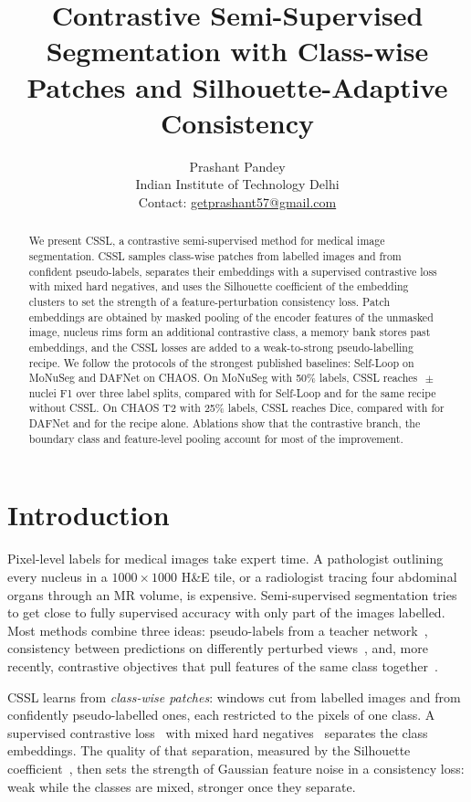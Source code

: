 \documentclass[11pt]{article}
\title{Contrastive Semi-Supervised Segmentation with Class-wise Patches and Silhouette-Adaptive Consistency}
\author{Prashant Pandey\\
Indian Institute of Technology Delhi\\
Contact: \href{mailto:getprashant57@gmail.com}{getprashant57@gmail.com}}
\date{}
\let\origpm\pm
\renewcommand{\pm}{\ensuremath{\,{\scriptstyle\origpm}\,}}
\begin{document}
\maketitle

\begin{abstract}
We present CSSL, a contrastive semi-supervised method for medical image segmentation. CSSL samples class-wise patches from labelled images and from confident pseudo-labels, separates their embeddings with a supervised contrastive loss with mixed hard negatives, and uses the Silhouette coefficient of the embedding clusters to set the strength of a feature-perturbation consistency loss. Patch embeddings are obtained by masked pooling of the encoder features of the unmasked image, nucleus rims form an additional contrastive class, a memory bank stores past embeddings, and the CSSL losses are added to a weak-to-strong pseudo-labelling recipe. We follow the protocols of the strongest published baselines: Self-Loop on MoNuSeg and DAFNet on CHAOS. On MoNuSeg with 50\% labels, CSSL reaches \nMcsslMean\pm\nMcsslSd{} nuclei F1 over three label splits, compared with \nSL{} for Self-Loop and \nMrecMean{} for the same recipe without CSSL. On CHAOS T2 with 25\% labels, CSSL reaches \nCcsslBMean{} Dice, compared with \nDAF{} for DAFNet and \nCrecBMean{} for the recipe alone. Ablations show that the contrastive branch, the boundary class and feature-level pooling account for most of the improvement.
\end{abstract}

\section{Introduction}
\label{sec:intro}

Pixel-level labels for medical images take expert time. A pathologist outlining every nucleus in a $1000\times1000$ H\&E tile, or a radiologist tracing four abdominal organs through an MR volume, is expensive. Semi-supervised segmentation tries to get close to fully supervised accuracy with only part of the images labelled. Most methods combine three ideas: pseudo-labels from a teacher network~\citep{lee2013pseudo,tarvainen2017mean}, consistency between predictions on differently perturbed views~\citep{laine2017temporal,sohn2020fixmatch,ouali2020cct,yang2023unimatch}, and, more recently, contrastive objectives that pull features of the same class together~\citep{chaitanya2020contrastive,liu2022reco,wang2021pixelcontrast}.

CSSL learns from \emph{class-wise patches}: windows cut from labelled images and from confidently pseudo-labelled ones, each restricted to the pixels of one class. A supervised contrastive loss~\citep{khosla2020supcon} with mixed hard negatives~\citep{kalantidis2020mochi} separates the class embeddings. The quality of that separation, measured by the Silhouette coefficient~\citep{rousseeuw1987silhouettes}, then sets the strength of Gaussian feature noise in a consistency loss: weak while the classes are mixed, stronger once they separate.
\end{document}
